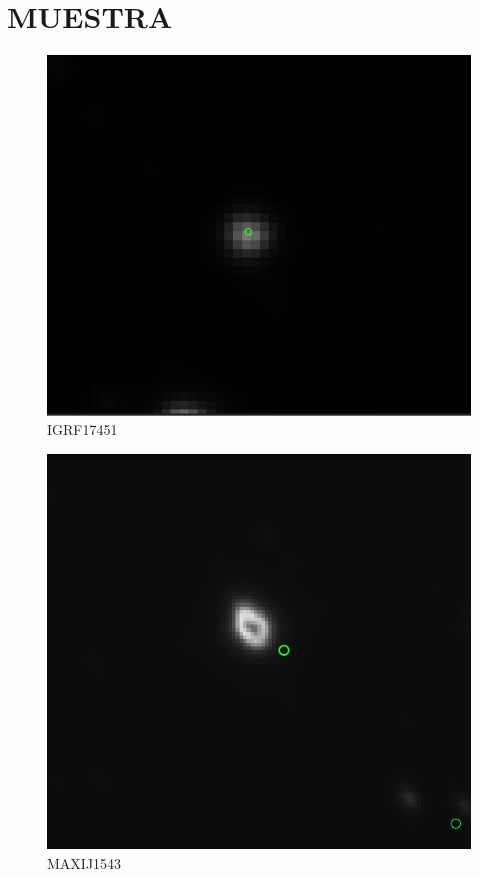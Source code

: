 \section*{MUESTRA}\label{sec:muestra}

\begin{figure}[ht]
    \centering
    \includegraphics[scale=0.35]{Imagenes/Rudik-1.png}
    \caption{IGRF17451}
    \label{fig:estrella-rudik}
\end{figure}
\begin{figure}[ht]
    \centering
    \includegraphics[scale=0.4]{Imagenes/Baptiste-1.png}
    \caption{MAXIJ1543}
    \label{fig:estrella-bapt}
\end{figure}

